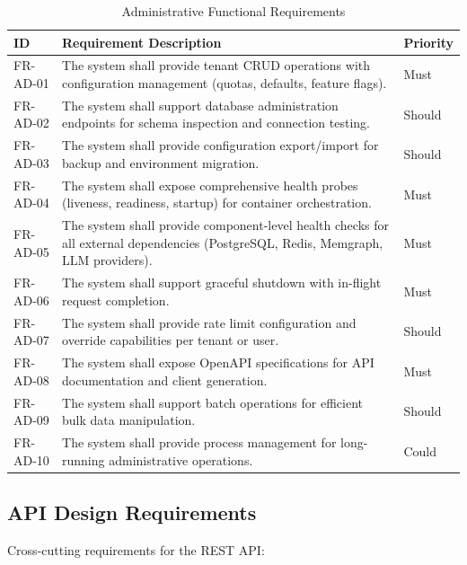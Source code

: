 \begin{table}[htbp]
\centering
\caption{Administrative Functional Requirements}
\label{tab:fr-admin}
\small
\begin{tabularx}{\textwidth}{|l|X|l|}
\hline
\textbf{ID} & \textbf{Requirement Description} & \textbf{Priority} \\
\hline
FR-AD-01 & The system shall provide tenant CRUD operations with configuration management (quotas, defaults, feature flags). & Must \\
\hline
FR-AD-02 & The system shall support database administration endpoints for schema inspection and connection testing. & Should \\
\hline
FR-AD-03 & The system shall provide configuration export/import for backup and environment migration. & Should \\
\hline
FR-AD-04 & The system shall expose comprehensive health probes (liveness, readiness, startup) for container orchestration. & Must \\
\hline
FR-AD-05 & The system shall provide component-level health checks for all external dependencies (PostgreSQL, Redis, Memgraph, LLM providers). & Must \\
\hline
FR-AD-06 & The system shall support graceful shutdown with in-flight request completion. & Must \\
\hline
FR-AD-07 & The system shall provide rate limit configuration and override capabilities per tenant or user. & Should \\
\hline
FR-AD-08 & The system shall expose OpenAPI specifications for API documentation and client generation. & Must \\
\hline
FR-AD-09 & The system shall support batch operations for efficient bulk data manipulation. & Should \\
\hline
FR-AD-10 & The system shall provide process management for long-running administrative operations. & Could \\
\hline
\end{tabularx}
\end{table}

\subsection{API Design Requirements}
\label{subsec:fr-api}

Cross-cutting requirements for the REST API:

